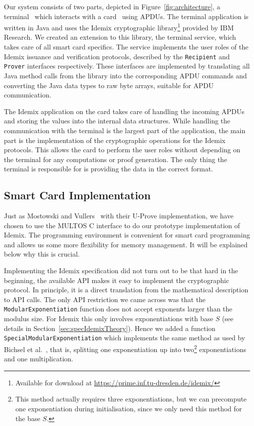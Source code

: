 Our system consists of two parts, depicted in Figure~\ref{fig:architecture}, a
terminal~ which interacts with a
card~ using APDUs. The terminal application is
written in Java and uses the Idemix cryptographic library\footnote{Available
for download at \url{https://prime.inf.tu-dresden.de/idemix/}} provided by IBM
Research. We created an extension to this library, the terminal service, which
takes care of all smart card specifics. The service implements the user roles
of the Idemix issuance and verification protocols, described by the
\texttt{Recipient} and \texttt{Prover} interfaces respectively. These
interfaces are implemented by translating all Java method calls from the
library into the corresponding APDU commands and converting the Java data types
to raw byte arrays, suitable for APDU communication.

The Idemix application on the card takes care of handling the incoming APDUs
and storing the values into the internal data structures. While handling the
communication with the terminal is the largest part of the application, the main
part is the implementation of the cryptographic operations for the Idemix
protocols. This allows the card to perform the user roles without depending on
the terminal for any computations or proof generation. The only thing the
terminal is responsible for is providing the data in the correct format.

\subsection{Smart Card Implementation}

Just as Mostowski and Vullers~\cite{MostowskiVullers11} with their U-Prove
implementation, we have chosen to use the MULTOS C interface to do our
prototype implementation of Idemix. The programming environment is convenient
for smart card programming and allows us some more flexibility for memory
management. It will be explained below why this is crucial.

Implementing the Idemix specification did not turn out to be that hard in the
beginning, the available API makes it easy to implement the cryptographic
protocol. In principle, it is a direct translation from the mathematical
description to API calls. The only API restriction we came across was that the
\texttt{ModularExponentiation} function does not accept exponents larger than
the modulus size. For Idemix this only involves exponentiations with base $S$
(see details in Section~\ref{sec:specIdemixTheory}). Hence we added a function
\texttt{SpecialModularExponentiation} which implements the same method as used
by Bichsel et al.~\cite{BichselCGS2009}, that is, splitting one exponentiation
up into two\footnote{This method actually requires three exponentiations, but
we can precompute one exponentiation during initialisation, since we only need
this method for the base $S$.} exponentiations and one multiplication.

